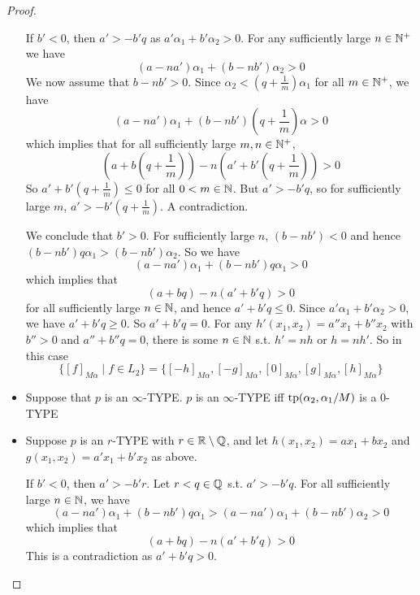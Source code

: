\documentclass[11pt]{article}
\begin{document}
\begin{proof}
\begin{itemize}
If \(b'<0\), then \(a'>-b'q\) as \(a'\alpha_1+b'\alpha_2>0\). For any sufficiently
large \(n\in\mathbb{N}^+\) we have
\begin{equation*}
(a-na')\alpha_1+(b-nb')\alpha_2>0
\end{equation*}
We now assume that \(b-nb'>0\). Since \(\alpha_2<(q+\frac{1}{m})\alpha_1\) for
all \(m\in\mathbb{N}^+\), we have
\begin{equation*}
(a-na')\alpha_1+(b-nb')(q+\frac{1}{m})\alpha>0
\end{equation*}
which implies that for all sufficiently large \(m,n\in\mathbb{N}^+\),
\begin{equation*}
(a+b(q+\frac{1}{m}))-n(a'+b'(q+\frac{1}{m}))>0
\end{equation*}
So \(a'+b'(q+\frac{1}{m})\le 0\) for all \(0<m\in\mathbb{N}\). But \(a'>-b'q\), so for sufficiently
large \(m\), \(a'>-b'(q+\frac{1}{m})\). A contradiction.

We conclude that \(b'>0\). For sufficiently large \(n\), \((b-nb')<0\) and
hence \((b-nb')q\alpha_1>(b-nb')\alpha_2\). So we have
\begin{equation*}
(a-na')\alpha_1+(b-nb')q\alpha_1>0
\end{equation*}
which implies that
\begin{equation*}
(a+bq)-n(a'+b'q)>0
\end{equation*}
for all sufficiently large \(n\in\mathbb{N}\), and hence \(a'+b'q\le 0\).
Since \(a'\alpha_1+b'\alpha_2>0\), we have \(a'+b'q\ge 0\). So \(a'+b'q=0\). For
any \(h'(x_1,x_2)=a''x_1+b''x_2\) with \(b''>0\) and \(a''+b''q=0\), there is some \(n\in\mathbb{N}\)
s.t. \(h'=nh\) or \(h=nh'\). So in this case
\begin{equation*}
\{[f]_{M\alpha}\mid f\in L_2\}=\{[-h]_{M\alpha},[-g]_{M\alpha},
[0]_{M\alpha},[g]_{M\alpha},[h]_{M\alpha}\}
\end{equation*}
\item Suppose that \(p\) is an \(\infty\)-TYPE. \(p\) is an \(\infty\)-TYPE
iff \(\operatorname{tp}(\alpha_2,\alpha_1/M)\) is a 0-TYPE
\item Suppose \(p\) is an \(r\)-TYPE with \(r\in\mathbb{R}\setminus\mathbb{Q}\), and let \(h(x_1,x_2)=ax_1+bx_2\)
and \(g(x_1,x_2)=a'x_1+b'x_2\) as above.

If \(b'<0\), then \(a'>-b'r\). Let \(r<q\in\mathbb{Q}\) s.t. \(a'>-b'q\). For all sufficiently
large \(n\in\mathbb{N}\), we have
\begin{equation*}
(a-na')\alpha_1+(b-nb')q\alpha_1>(a-na')\alpha_1+(b-nb')\alpha_2>0
\end{equation*}
which implies that
\begin{equation*}
(a+bq)-n(a'+b'q)>0
\end{equation*}
This is a contradiction as \(a'+b'q>0\).


\end{itemize}
\end{proof}
\end{document}
